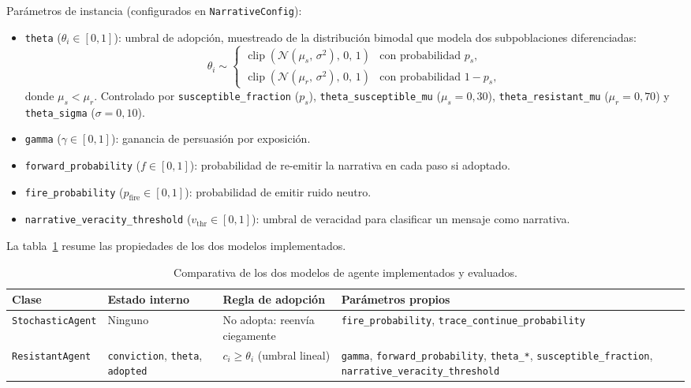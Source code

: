 \noindent Parámetros de instancia (configurados en \texttt{NarrativeConfig}):
\begin{itemize}[noitemsep]
  \item \texttt{theta} ($\theta_i \in [0,1]$): umbral de adopción, muestreado de la distribución bimodal que modela dos subpoblaciones diferenciadas:
  \begin{equation}
    \label{eq:theta}
    \theta_i \sim
    \begin{cases}
      \operatorname{clip}\!\left(\mathcal{N}(\mu_s,\,\sigma^2),\,0,\,1\right) & \text{con probabilidad } p_s,\\[4pt]
      \operatorname{clip}\!\left(\mathcal{N}(\mu_r,\,\sigma^2),\,0,\,1\right) & \text{con probabilidad } 1 - p_s,
    \end{cases}
  \end{equation}
  donde $\mu_s < \mu_r$. Controlado por \texttt{susceptible\_fraction} ($p_s$), \texttt{theta\_susceptible\_mu} ($\mu_s = 0{,}30$), \texttt{theta\_resistant\_mu} ($\mu_r = 0{,}70$) y \texttt{theta\_sigma} ($\sigma = 0{,}10$).
  \item \texttt{gamma} ($\gamma \in [0,1]$): ganancia de persuasión por exposición.
  \item \texttt{forward\_probability} ($f \in [0,1]$): probabilidad de re-emitir la narrativa en cada paso si adoptado.
  \item \texttt{fire\_probability} ($p_{\text{fire}} \in [0,1]$): probabilidad de emitir ruido neutro.
  \item \texttt{narrative\_veracity\_threshold} ($v_{\text{thr}} \in [0,1]$): umbral de veracidad para clasificar un mensaje como narrativa.
\end{itemize}

La tabla~\ref{tab:agentes-impl} resume las propiedades de los dos modelos implementados.

\begin{table}[H]
\centering
\small
\caption{Comparativa de los dos modelos de agente implementados y evaluados.}
\label{tab:agentes-impl}
\begin{tabular}{@{}p{3.0cm} p{3.2cm} p{3.4cm} p{4.0cm}@{}}
\toprule
\textbf{Clase} &
\textbf{Estado interno} &
\textbf{Regla de adopción} &
\textbf{Parámetros propios} \\
\midrule
\texttt{StochasticAgent}
  & Ninguno
  & No adopta: reenvía ciegamente
  & \texttt{fire\_probability}, \texttt{trace\_continue\_probability} \\
\addlinespace
\texttt{ResistantAgent}
  & \texttt{conviction}, \texttt{theta}, \texttt{adopted}
  & $c_i \geq \theta_i$ (umbral lineal)
  & \texttt{gamma}, \texttt{forward\_probability}, \texttt{theta\_*}, \texttt{susceptible\_fraction}, \texttt{narrative\_veracity\_threshold} \\
\bottomrule
\end{tabular}
\end{table}
